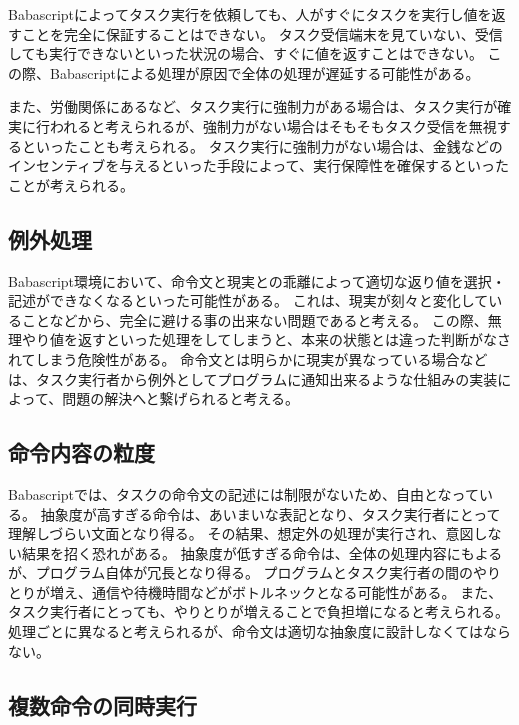 Babascriptによってタスク実行を依頼しても、人がすぐにタスクを実行し値を返すことを完全に保証することはできない。
タスク受信端末を見ていない、受信しても実行できないといった状況の場合、すぐに値を返すことはできない。
この際、Babascriptによる処理が原因で全体の処理が遅延する可能性がある。

また、労働関係にあるなど、タスク実行に強制力がある場合は、タスク実行が確実に行われると考えられるが、強制力がない場合はそもそもタスク受信を無視するといったことも考えられる。
タスク実行に強制力がない場合は、金銭などのインセンティブを与えるといった手段によって、実行保障性を確保するといったことが考えられる。

\subsection{例外処理}\label{ux4f8bux5916ux51e6ux7406}

Babascript環境において、命令文と現実との乖離によって適切な返り値を選択・記述ができなくなるといった可能性がある。
これは、現実が刻々と変化していることなどから、完全に避ける事の出来ない問題であると考える。
この際、無理やり値を返すといった処理をしてしまうと、本来の状態とは違った判断がなされてしまう危険性がある。
命令文とは明らかに現実が異なっている場合などは、タスク実行者から例外としてプログラムに通知出来るような仕組みの実装によって、問題の解決へと繋げられると考える。

\subsection{命令内容の粒度}\label{ux547dux4ee4ux5185ux5bb9ux306eux7c92ux5ea6}

Babascriptでは、タスクの命令文の記述には制限がないため、自由となっている。
抽象度が高すぎる命令は、あいまいな表記となり、タスク実行者にとって理解しづらい文面となり得る。
その結果、想定外の処理が実行され、意図しない結果を招く恐れがある。
抽象度が低すぎる命令は、全体の処理内容にもよるが、プログラム自体が冗長となり得る。
プログラムとタスク実行者の間のやりとりが増え、通信や待機時間などがボトルネックとなる可能性がある。
また、タスク実行者にとっても、やりとりが増えることで負担増になると考えられる。
処理ごとに異なると考えられるが、命令文は適切な抽象度に設計しなくてはならない。

\subsection{複数命令の同時実行}\label{ux8907ux6570ux547dux4ee4ux306eux540cux6642ux5b9fux884c}

